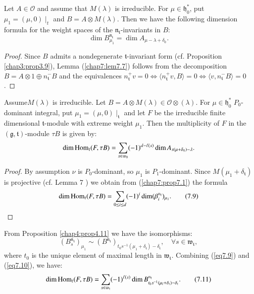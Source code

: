 \begin{lemma}\label{chap7:lem7.7}
Let $A \in \mathscr{O}$ and assume that $M(\lambda)$ is
irreducible. For $\mu \in \mathfrak{h}^*_0$, put $\mu_1 = (\mu, 0)
\mid_t$ and $B = A \otimes M (\lambda)$. Then we have the following
dimension formula for the weight spaces of the
$\mathfrak{n}_\mathfrak{t}$-invariants in $B$:
$$
\dim B^{\mathfrak{n}_\mathfrak{t}}_{\mu_1} = \dim A_{\mu  - \lambda +
  \delta_0}. 
$$
\end{lemma}

\begin{proof}
Since $B$ admits a nondegenerate $\mathfrak{t}$-invariant form
(cf. Proposition \ref{chap3:prop3.9}), Lemma (\ref{chap7:lem7.7})
follows from the decomposition $B = 
A \otimes 1 \oplus n^-_\mathfrak{t} B$ and the equivalences
$n^+_\mathfrak{t} v = 0 \Leftrightarrow \langle n^+_\mathfrak{t} v, B
\rangle = 0 \Leftrightarrow \langle v, n^-_\mathfrak{t} B \rangle =
0$.  
\end{proof}

\begin{prop}\label{chap7:prop7.8}
Assume\pageoriginale $M(\lambda)$ is irreducible. Let $B = A \otimes
M(\lambda) \in \mathscr{O} \otimes (\lambda)$. For $\mu \in
\mathfrak{h}^*_0$ $P_0$-dominant integral, put $\mu_1 = (\mu, 0)
\mid_\mathfrak{t}$ and let $F$ be the irreducible finite dimensional
$\mathfrak{t}$-module with extreme weight $\mu_1$. Then the
multiplicity of $F$ in the $(\mathfrak{g}, \mathfrak{t})$-module $\tau
B$ is given by:
$$
\dim \operatorname{Hom}_\mathfrak{t} (F, \tau B) = \sum\limits_{s \in
  \mathfrak{w}_0} (-1)^{d-\ell(s)} \dim A_{s(\mu +
  \delta_0)-\lambda}. 
$$
\end{prop}

\begin{proof}
By assumption $\nu$ is $P_0$-dominant, so $\mu_1$ is
$P_1$-dominant. Since $M(\mu_1+ \delta_\mathfrak{t})$ is projective
(cf. Lemma 7 \cite{key12}) we obtain from (\ref{chap7:prop7.1}) the formula
\begin{equation*}
\dim \operatorname{Hom}_{\mathfrak{t}} (F, \tau B) = \sum\limits_{0 \leq i \leq d}
(-1)^i \dim (\beta^{\mathfrak{n}_\mathfrak{t}}_i)_{\mu_1}. \tag{7.9}\label{eq7.9}
\end{equation*}
\end{proof}

From Proposition \ref{chap4:prop4.11} \cite{key15} we have the isomorphisms:
\begin{equation*} 
(B^{\mathfrak{n}_\mathfrak{t}}_s)_{\mu_1} \sim
  (B^{\mathfrak{n}_\mathfrak{t}})_{t_0 s^{-1} (\mu_1 +
    \delta_\mathfrak{t})-\delta_\mathfrak{t}} , \quad \forall s \in
  \mathfrak{w}_\mathfrak{t}, \tag{7.10}\label{eq7.10}
\end{equation*}
where $t_0$ is the unique element of maximal length in
$\mathfrak{w}_\mathfrak{t}$. Combining (\ref{eq7.9}) and (\ref{eq7.10}), we have:
\begin{equation*}
\dim \operatorname{Hom}_\mathfrak{t} (F, \tau B) = \sum\limits_{s \in
  \mathfrak{w}_\mathfrak{t}} (-1)^{\ell(s)} \dim
B^{\mathfrak{n}_\mathfrak{t}}_{t_0 s^{-1}
  (\mu_l+\delta_\mathfrak{t})-\delta_\mathfrak{t}}. \tag{7.11}\label{eq7.11}
\end{equation*}

